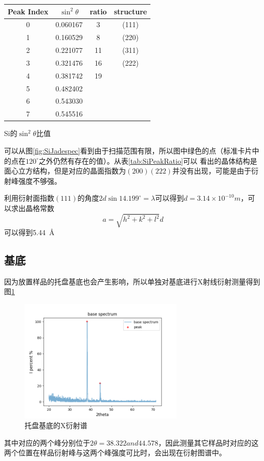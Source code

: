 \documentclass[10pt]{ctexart}
\begin{document}
\begin{minipage}{0.45\textwidth}
{\small
\begin{tabular}{|c|c|c|c|}
    \textbf{Peak Index} & \textbf{$\sin^2{\theta}$}& \textbf{ratio}& \textbf{structure}\\
    \hline
    0  &  0.060167&3&(111)\\
1   & 0.160529&8&(220)\\
2  &  0.221077&11&(311)\\
3  &  0.321476&16&(222)\\
4  &  0.381742&19&\\
5  &  0.482402&&\\
6  &  0.543030&&\\
7  &  0.545516&&\\
\end{tabular}
\centering
Si的$\sin^2{\theta}$比值
\label{tab:SiPeakRatio}
}
\end{minipage}
\begin{minipage}{0.5\textwidth}
    可以从图\ref{fig:SiJadespec}看到由于扫描范围有限，所以图中绿色的点（标准卡片中的点在$120^\circ$之外仍然有存在的值）。从表\ref{tab:SiPeakRatio}可以
    看出的晶体结构是面心立方结构，但是对应的晶面指数为$(200)(222)$并没有出现，可能是由于衍射峰强度不够强。

    利用衍射面指数$(111)$的角度$2d\sin{14.199^\circ}=\lambda$可以得到$d=3.14\times 10^{-10}m$，可以求出晶格常数
    \[a=\sqrt{h^2+k^2+l^2}d\]
    可以得到\SI{5.44}{\angstrom}
\end{minipage}
\subsection{基底}
因为放置样品的托盘基底也会产生影响，所以单独对基底进行X射线衍射测量得到图\ref{fig:base}
\begin{figure}[htbp]
    \centering
    \includegraphics[width=0.7\textwidth]{data/base/spectrum.png}
    \caption{托盘基底的X衍射谱}
    \label{fig:base}
\end{figure}
其中对应的两个峰分别位于$2\theta=38.322 and 44.578$，因此测量其它样品时对应的这两个位置在样品衍射峰与这两个峰强度可比时，会出现在衍射图谱中。
\end{document}
